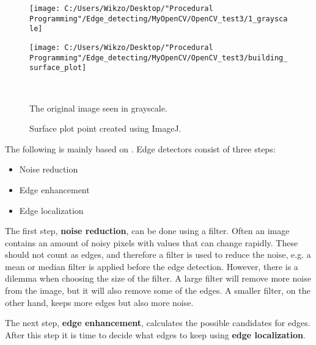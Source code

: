 \begin{figure}[htbp]\centering
	\begin{minipage}[b]{0.48\textwidth}\centering
		\texttt{[image: C:/Users/Wikzo/Desktop/"Procedural Programming"/Edge\_detecting/MyOpenCV/OpenCV\_test3/1\_grayscale]} %
	\end{minipage}\hfill
	\begin{minipage}[b]{0.48\textwidth}\centering
		\texttt{[image: C:/Users/Wikzo/Desktop/"Procedural Programming"/Edge\_detecting/MyOpenCV/OpenCV\_test3/building\_surface\_plot]} %
	\end{minipage}\\ %
	\begin{minipage}[t]{0.48\textwidth}
		\caption{The original image seen in grayscale.} %
		\label{building_gray}
	\end{minipage}\hfill
	\begin{minipage}[t]{0.48\textwidth}
		\caption{Surface plot point created using ImageJ.} %
		\label{surface_plot}
	\end{minipage}
\end{figure}

The following is mainly based on \citep{edge_lecture}.
Edge detectors consist of three steps:
\begin{itemize}
\item Noise reduction
\item Edge enhancement
\item Edge localization
\end{itemize}

The first step, \textbf{noise reduction}, can be done using a filter. Often an image contains an amount of noisy pixels with values that can change rapidly. These should not count as edges, and therefore a filter is used to reduce the noise, e.g. a mean or median filter is applied before the edge detection. However, there is a dilemma when choosing the size of the filter. A large filter will remove more noise from the image, but it will also remove some of the edges. A smaller filter, on the other hand, keeps more edges but also more noise.

The next step, \textbf{edge enhancement}, calculates the possible candidates for edges. After this step it is time to decide what edges to keep using \textbf{edge localization}.


